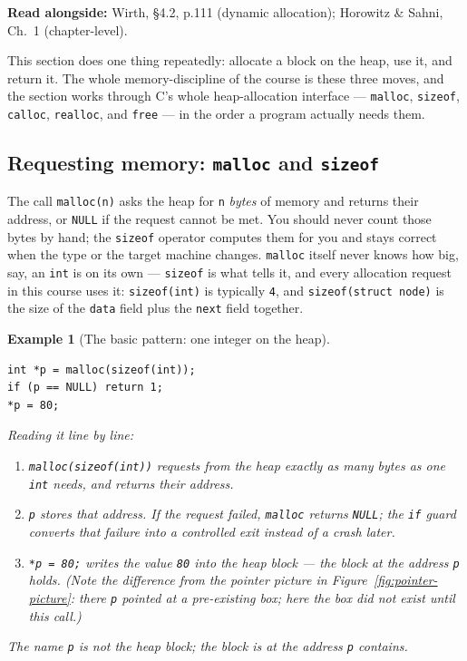 \documentclass[11pt]{article}
\newtheorem{example}{Example}[section]
\begin{document}
\textbf{Read alongside:} Wirth, \S4.2, p.111 (dynamic allocation); Horowitz \& Sahni, Ch.~1 (chapter-level).

This section does one thing repeatedly: allocate a block on the heap, use it,
and return it. The whole memory-discipline of the course is these three
moves, and the section works through C's whole heap-allocation interface ---
\texttt{malloc}, \texttt{sizeof}, \texttt{calloc}, \texttt{realloc}, and
\texttt{free} --- in the order a program actually needs them.

\subsection{Requesting memory: \texttt{malloc} and \texttt{sizeof}}

The call \texttt{malloc(n)} asks the heap for \texttt{n} \emph{bytes} of memory
and returns their address, or \texttt{NULL} if the request cannot be met. You
should never count those bytes by hand; the \texttt{sizeof} operator computes
them for you and stays correct when the type or the target machine changes.
\texttt{malloc} itself never knows how big, say, an \texttt{int} is on its
own --- \texttt{sizeof} is what tells it, and every allocation request in this
course uses it: \texttt{sizeof(int)} is typically \texttt{4}, and
\texttt{sizeof(struct node)} is the size of the \texttt{data} field plus the
\texttt{next} field together.

\begin{example}[The basic pattern: one integer on the heap]
{\footnotesize
\begin{verbatim}
int *p = malloc(sizeof(int));
if (p == NULL) return 1;
*p = 80;
\end{verbatim}
}
Reading it line by line:
\begin{enumerate}
  \item \texttt{malloc(sizeof(int))} requests from the heap exactly as many
    bytes as one \texttt{int} needs, and returns their address.
  \item \texttt{p} stores that address. If the request failed, \texttt{malloc}
    returns \texttt{NULL}; the \texttt{if} guard converts that failure into a
    controlled exit instead of a crash later.
  \item \texttt{*p = 80;} writes the value \texttt{80} into the heap block ---
    the block \emph{at} the address \texttt{p} holds. (Note the difference from
    the pointer picture in Figure~\ref{fig:pointer-picture}: there \texttt{p}
    pointed at a pre-existing box; here the box did not exist until this call.)
\end{enumerate}
The name \texttt{p} is not the heap block; the block is at the address
\texttt{p} contains.
\end{example}
\end{document}
